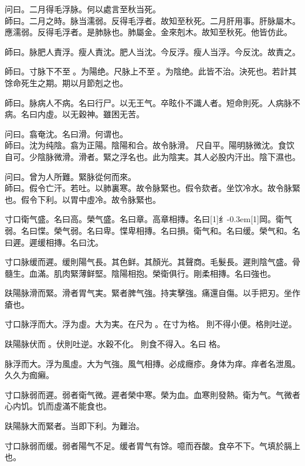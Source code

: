 \documentclass[oneside,b4paper]{ctexbook}
\begin{document}
\begin{flushleft}
问曰。二月得毛浮脉。何以處言至秋当死。\\
師曰。二月之時。脉当濡弱。反得毛浮者。故知至秋死。二月肝用事。肝脉屬木。應濡弱。反得毛浮者。是肺脉也。肺屬金。金來剋木。故知至秋死。他皆仿此。

師曰。脉肥人責浮。瘦人責沈。肥人当沈。今反浮。瘦人当浮。今反沈。故責之。

師曰。寸脉下不至{𬮦}。为陽绝。尺脉上不至{𬮦}。为陰绝。此皆不治。決死也。若計其馀命死生之期。期以月節剋之也。

師曰。脉病人不病。名曰行尸。以无王气。卒眩仆不識人者。短命則死。人病脉不病。名曰内虛。以无穀神。雖困无苦。

问曰。翕奄沈。名曰滑。何谓也。\\
師曰。沈为纯陰。翕为正陽。陰陽和合。故令脉滑。{𬮦}尺自平。陽明脉微沈。食饮自可。少陰脉微滑。滑者。緊之浮名也。此为陰実。其人必股内汗出。陰下濕也。

问曰。曾为人所難。緊脉從何而來。\\
師曰。假令亡汗。若吐。以肺裏寒。故令脉緊也。假令欬者。坐饮冷水。故令脉緊也。假令下利。以胃中虛冷。故令脉緊也。

寸口衛气盛。名曰高。榮气盛。名曰章。高章相摶。名曰{\hbox{\scalebox{0.6}[1]{纟}\kern-0.3em\scalebox{0.63}[1]{岡}}}。衛气弱。名曰惵。榮气弱。名曰卑。惵卑相摶。名曰損。衛气和。名曰缓。榮气和。名曰遲。遲缓相摶。名曰沈。

寸口脉缓而遲。缓則陽气長。其色鲜。其顏光。其聲商。毛髮長。遲則陰气盛。骨髓生。血滿。肌肉緊薄鲜堅。陰陽相抱。榮衛俱行。剛柔相摶。名曰強也。

趺陽脉滑而緊。滑者胃气実。緊者脾气強。持実擊強。痛還自傷。以手把刃。坐作瘡也。

寸口脉浮而大。浮为虛。大为実。在尺为{𬮦}。在寸为格。{𬮦}則不得小便。格則吐逆。

趺陽脉伏而{𬈧}。伏則吐逆。水穀不化。{𬈧}則食不得入。名曰{𬮦}格。

脉浮而大。浮为風虛。大为气強。風气相摶。必成癮疹。身体为痒。痒者名泄風。久久为痂癩。

寸口脉弱而遲。弱者衛气微。遲者榮中寒。榮为血。血寒則發熱。衛为气。气微者心内饥。饥而虛滿不能食也。

趺陽脉大而緊者。当即下利。为難治。

寸口脉弱而缓。弱者陽气不足。缓者胃气有馀。噫而吞酸。食卒不下。气填於膈上也。


\end{flushleft}
\end{document}
